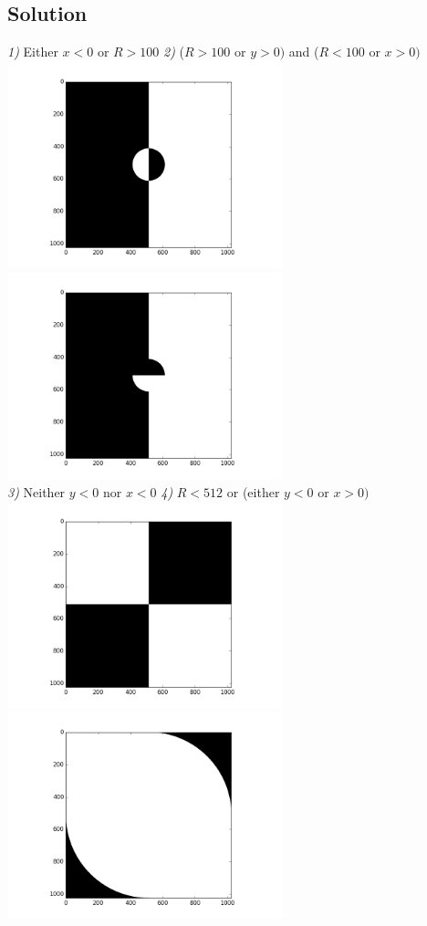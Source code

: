 \documentclass{article}
\begin{document}
  \vspace{2em}

  \subsection{Solution}
    \emph{1)} Either \(x < 0\) or \(R > 100\) \hfill
    \emph{2)} (\(R > 100\) or \(y > 0)\) and (\(R < 100\) or \(x > 0)\)\\
    \includegraphics[width=8cm]{figure_1.png}
    \includegraphics[width=8cm]{figure_2.png}\\
    \newpage
    \emph{3)} Neither \(y < 0\) nor \(x < 0\) \hfill
    \emph{4)} \(R < 512\) or (either \(y < 0\) or \(x > 0)\)\\
    \includegraphics[width=8cm]{figure_3.png}
    \includegraphics[width=8cm]{figure_4.png}\\
\end{document}
